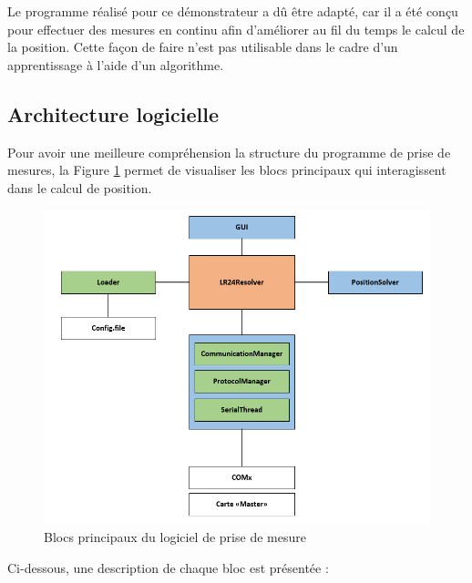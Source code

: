 Le programme réalisé pour ce démonstrateur a dû être adapté, car il a été conçu pour effectuer des mesures en continu afin d'améliorer au fil du temps le calcul de la position. Cette façon de faire n'est pas utilisable dans le cadre d'un apprentissage à l'aide d'un algorithme.

\subsection{Architecture logicielle}
Pour avoir une meilleure compréhension la structure du programme de prise de mesures, la Figure \ref{fig:archLR24} permet de visualiser les blocs principaux qui interagissent dans le calcul de position.

\begin{figure}[htp]
 \begin{center}
  \includegraphics[scale=0.7]{figures/architecture_LR24.PNG}
  \caption{Blocs principaux du logiciel de prise de mesure}
  \label{fig:archLR24} %
 \end{center}
\end{figure}

Ci-dessous, une description de chaque bloc est présentée :

